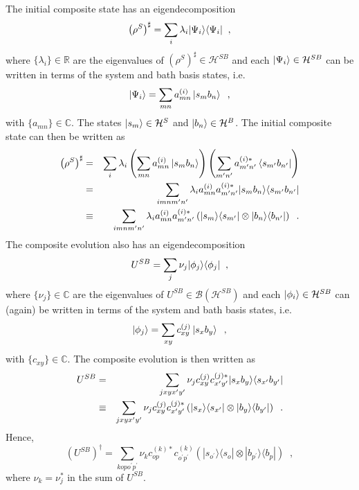 The initial composite state has an eigendecomposition
$$
\left(\rho^{S}\right)^\sharp = \sum_i \lambda_i |\Psi_i\rangle\langle\Psi_i|\;\;,
$$
where $\{\lambda_i\}\in\mathbb{R}$ are the eigenvalues of $\left(\rho^{S}\right)^\sharp\in\mathcal{H}^{SB}$ and each $\left|\Psi_i\right\rangle\in\mathcal{H}^{SB}$ can be written in terms of the system and bath basis states, i.e.\ 
$$
\left|\Psi_i\right\rangle = \sum_{mn} a_{mn}^{(i)} \left|s_m b_n\right\rangle\;\;,
$$
with $\{a_{mn}\}\in\mathbb{C}$.  The states $\left|s_m\right\rangle\in\mathcal{H}^S$ and $\left|b_n\right\rangle\in\mathcal{H}^B$.  The initial composite state can then be written as
\begin{eqnarray}
\left(\rho^{S}\right)^\sharp &=& \sum_i \lambda_i \left(\sum_{mn} a_{mn}^{(i)} \left|s_m b_n\right\rangle\right)\left(\sum_{m^\prime n^\prime} a_{m^\prime n^\prime}^{(i)*} \left\langle s_{m^\prime} b_{n^\prime}\right|\right)\\
&=& \sum_{imnm^\prime n^\prime} \lambda_i a_{mn}^{(i)}a_{m^\prime n^\prime}^{(i)*} |s_m b_n\rangle\langle s_{m^\prime} b_{n^\prime}|\\
&\equiv& \sum_{imnm^\prime n^\prime} \lambda_i a_{mn}^{(i)}a_{m^\prime n^\prime}^{(i)*} \left(|s_m\rangle\langle s_{m^\prime}| \otimes |b_n\rangle\langle b_{n^\prime}|\right)\;\;.
\end{eqnarray}
The composite evolution also has an eigendecomposition 
$$
U^{SB} = \sum_j \nu_j |\phi_j\rangle\langle\phi_j|\;\;,
$$
where $\{\nu_j\}\in\mathbb{C}$ are the eigenvalues of $U^{SB}\in\mathcal{B}(\mathcal{H}^{SB})$ and each $\left|\phi_i\right\rangle\in\mathcal{H}^{SB}$ can (again) be written in terms of the system and bath basis states, i.e.
$$
\left|\phi_j\right\rangle = \sum_{xy} c_{xy}^{(j)} \left|s_x b_y\right\rangle\;\;,
$$
with $\{c_{xy}\}\in\mathbb{C}$.  The composite evolution is then written as
\begin{eqnarray}
U^{SB} &=& \sum_{jxyx^\prime y^\prime} \nu_j c_{xy}^{(j)}c_{x^\prime y^\prime}^{(j)*} |s_x b_y\rangle\langle s_{x^\prime} b_{y^\prime}|\\
&\equiv& \sum_{jxyx^\prime y^\prime} \nu_j c_{xy}^{(j)}c_{x^\prime y^\prime}^{(j)*}\left( |s_x\rangle\langle s_{x^\prime}| \otimes |b_y\rangle\langle b_{y^\prime}|\right)\;\;.
\end{eqnarray}
Hence,
$$
\left(U^{SB}\right)^\dagger = \sum_{kopo^\prime p^\prime} \nu_k c_{op}^{(k)*}c_{o^\prime p^\prime}^{(k)} \left(|s_{o^\prime} \rangle\langle s_{o} | \otimes |b_{p^\prime} \rangle\langle b_{p} |\right)\;\;,
$$
where $\nu_k=\nu_j^*$ in the sum of $U^{SB}$.


